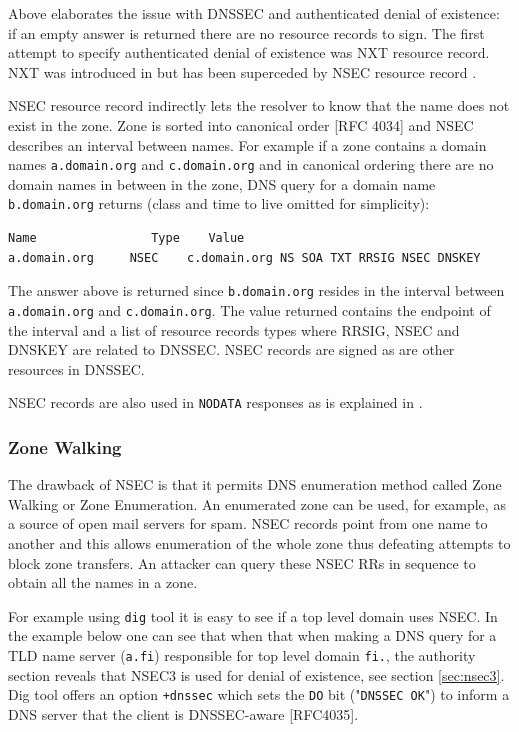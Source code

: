 Above elaborates the issue with DNSSEC and authenticated denial of existence: if an empty answer is returned there are no resource records to sign. The first attempt to specify authenticated denial of existence was NXT resource record. NXT was introduced in \cite{RFC_2065} but has been superceded by NSEC resource record \cite{RFC3845}.

NSEC resource record indirectly lets the resolver to know that the name does not exist in the zone. Zone is sorted into canonical order [RFC 4034] and NSEC describes an interval between names. For example if a zone contains a domain names \texttt{a.domain.org} and \texttt{c.domain.org} and in canonical ordering there are no domain names in between in the zone, DNS query for a domain name \texttt{b.domain.org} returns (class and time to live omitted for simplicity):

\begin{verbatim}
Name	            Type    Value
a.domain.org     NSEC    c.domain.org NS SOA TXT RRSIG NSEC DNSKEY
\end{verbatim}

The answer above is returned since \texttt{b.domain.org} resides in the interval between \texttt{a.domain.org} and \texttt{c.domain.org}. The value returned contains the endpoint of the interval and a list of resource records types where RRSIG, NSEC and DNSKEY are related to DNSSEC. NSEC records are signed as are other resources in DNSSEC. 

NSEC records are also used in \texttt{NODATA} responses as is explained in \citep{RFC_7129}.


\subsubsection{Zone Walking}

The drawback of NSEC is that it permits DNS enumeration method called Zone Walking or Zone Enumeration. An enumerated zone can be used, for example, as a source of open mail servers for spam. NSEC records point from one name to another and this allows enumeration of the whole zone thus defeating attempts to block zone transfers. An attacker can query these NSEC RRs in sequence to obtain all the names in a zone. \citep{RFC3550} \citep{hacking_exposed} \citep{RFC_7129} 

For example using \texttt{dig} tool it is easy to see if a top level domain uses NSEC. In the example below one can see that when that when making a DNS query for a TLD name server (\texttt{a.fi}) responsible for top level domain \texttt{fi.}, the authority section reveals that NSEC3 is used for denial of existence, see section \ref{sec:nsec3}. Dig tool offers an option \texttt{+dnssec} which sets the \texttt{DO} bit ("\texttt{DNSSEC OK}") to inform a DNS server that the client is DNSSEC-aware [RFC4035].


